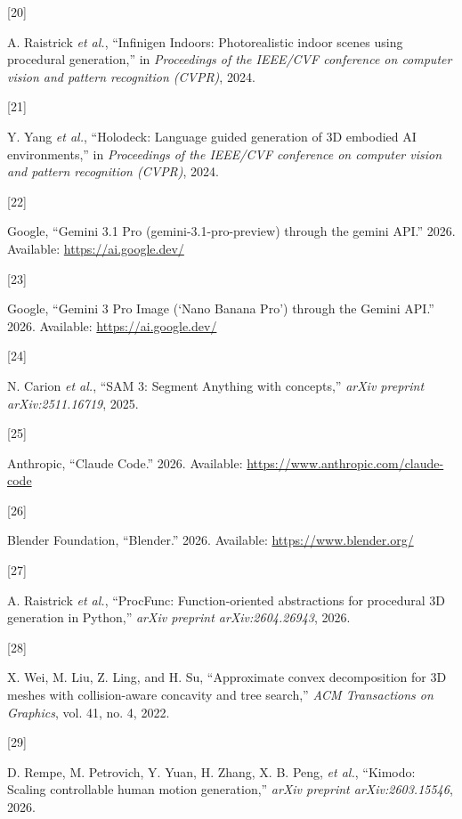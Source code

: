 \documentclass[
  11pt,
]{article}
\newlength{\cslhangindent}
\newlength{\csllabelwidth}
\newenvironment{CSLReferences}[2] %
 {\begin{list}{}{%
  \setlength{\itemindent}{0pt}
  \setlength{\leftmargin}{0pt}
  \setlength{\parsep}{0pt}
  \ifodd #1
   \setlength{\leftmargin}{\cslhangindent}
   \setlength{\itemindent}{-1\cslhangindent}
  \fi
  \setlength{\itemsep}{#2\baselineskip}}}
 {\end{list}}
\newcommand{\CSLLeftMargin}[1]{\parbox[t]{\csllabelwidth}{\strut#1\strut}}
\newcommand{\CSLRightInline}[1]{\parbox[t]{\linewidth - \csllabelwidth}{\strut#1\strut}}
\begin{document}
\begin{CSLReferences}{0}{0}
\CSLLeftMargin{{[}20{]} }%
\CSLRightInline{A. Raistrick \emph{et al.}, {``{Infinigen Indoors}:
Photorealistic indoor scenes using procedural generation,''} in
\emph{Proceedings of the IEEE/CVF conference on computer vision and
pattern recognition (CVPR)}, 2024.}

\CSLLeftMargin{{[}21{]} }%
\CSLRightInline{{Y. Yang \emph{et al.}}, {``Holodeck: Language guided
generation of {3D} embodied {AI} environments,''} in \emph{Proceedings
of the IEEE/CVF conference on computer vision and pattern recognition
(CVPR)}, 2024.}

\CSLLeftMargin{{[}22{]} }%
\CSLRightInline{Google, {``{Gemini 3.1 Pro} (gemini-3.1-pro-preview)
through the gemini {API}.''} 2026. Available:
\url{https://ai.google.dev/}}

\CSLLeftMargin{{[}23{]} }%
\CSLRightInline{Google, {``{Gemini 3 Pro Image ({`Nano Banana Pro'})
through the Gemini {API}}.''} 2026. Available:
\url{https://ai.google.dev/}}

\CSLLeftMargin{{[}24{]} }%
\CSLRightInline{{N. Carion \emph{et al.}}, {``{SAM 3}: {Segment
Anything} with concepts,''} \emph{arXiv preprint arXiv:2511.16719},
2025.}

\CSLLeftMargin{{[}25{]} }%
\CSLRightInline{Anthropic, {``{Claude Code}.''} 2026. Available:
\url{https://www.anthropic.com/claude-code}}

\CSLLeftMargin{{[}26{]} }%
\CSLRightInline{Blender Foundation, {``{Blender}.''} 2026. Available:
\url{https://www.blender.org/}}

\CSLLeftMargin{{[}27{]} }%
\CSLRightInline{A. Raistrick \emph{et al.}, {``{ProcFunc}:
Function-oriented abstractions for procedural {3D} generation in
{Python},''} \emph{arXiv preprint arXiv:2604.26943}, 2026.}

\CSLLeftMargin{{[}28{]} }%
\CSLRightInline{X. Wei, M. Liu, Z. Ling, and H. Su, {``Approximate
convex decomposition for {3D} meshes with collision-aware concavity and
tree search,''} \emph{ACM Transactions on Graphics}, vol. 41, no. 4,
2022.}

\CSLLeftMargin{{[}29{]} }%
\CSLRightInline{{D. Rempe, M. Petrovich, Y. Yuan, H. Zhang, X. B. Peng,
\emph{et al.}}, {``{Kimodo}: Scaling controllable human motion
generation,''} \emph{arXiv preprint arXiv:2603.15546}, 2026.}


\end{CSLReferences}
\end{document}

